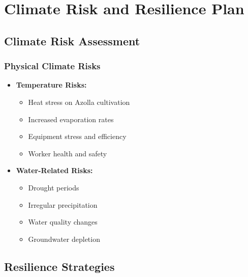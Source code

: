 \section{Climate Risk and Resilience Plan}

\subsection{Climate Risk Assessment}

\subsubsection{Physical Climate Risks}
\begin{itemize}
    \item \textbf{Temperature Risks:}
    \begin{itemize}
        \item Heat stress on Azolla cultivation
        \item Increased evaporation rates
        \item Equipment stress and efficiency
        \item Worker health and safety
    \end{itemize}
    
    \item \textbf{Water-Related Risks:}
    \begin{itemize}
        \item Drought periods
        \item Irregular precipitation
        \item Water quality changes
        \item Groundwater depletion
    \end{itemize}
\end{itemize}

\subsection{Resilience Strategies}

